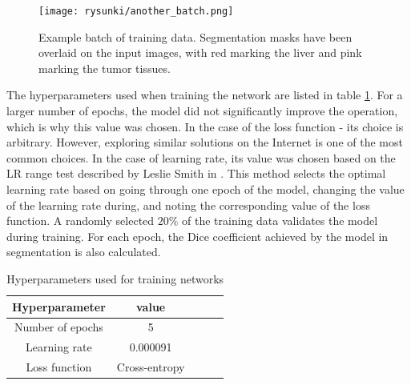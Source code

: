 \begin{figure}[!h]
	\centering \texttt{[image: rysunki/another\_batch.png]}
	\caption{Example batch of training data. Segmentation masks have been overlaid on the input images, with red marking the liver and pink marking the tumor tissues.}
	\label{rys:batch}
\end{figure}
The hyperparameters used when training the network are listed in table \ref{tab:Hyperparameters}. For a larger number of epochs, the model did not significantly improve the operation, which is why this value was chosen. In the case of the loss function - its choice is arbitrary. However, exploring similar solutions on the Internet is one of the most common choices. In the case of learning rate, its value was chosen based on the LR range test described by Leslie Smith in \cite{smith_cyclical_2017}. This method selects the optimal learning rate based on going through one epoch of the model, changing the value of the learning rate during, and noting the corresponding value of the loss function. A randomly selected $20\%$ of the training data validates the model during training. For each epoch, the Dice coefficient achieved by the model in segmentation is also calculated.


 
\begin{table}[h!]
    \centering
    \begin{tabular}{|c|c|c|c|c|}
    \hline
        Hyperparameter & value  \\
        \hline 
        Number of epochs & 5 \\
        \hline
        Learning rate & 0.000091\\
        \hline
        Loss function & Cross-entropy\\
        \hline
    \end{tabular}
    \caption{Hyperparameters used for training networks }
    \label{tab:Hyperparameters}
\end{table}




